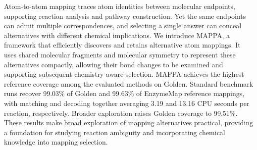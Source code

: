 Atom-to-atom mapping traces atom identities between molecular endpoints, supporting reaction analysis and pathway construction. Yet the same endpoints can admit multiple correspondences, and selecting a single answer can conceal alternatives with different chemical implications. We introduce MAPPA, a framework that efficiently discovers and retains alternative atom mappings. It uses shared molecular fragments and molecular symmetry to represent these alternatives compactly, allowing their bond changes to be examined and supporting subsequent chemistry-aware selection. MAPPA achieves the highest reference coverage among the evaluated methods on Golden. Standard benchmark runs recover 99.03\% of Golden and 99.63\% of EnzymeMap reference mappings, with matching and decoding together averaging 3.19 and 13.16 CPU seconds per reaction, respectively. Broader exploration raises Golden coverage to 99.51\%. These results make broad exploration of mapping alternatives practical, providing a foundation for studying reaction ambiguity and incorporating chemical knowledge into mapping selection.
